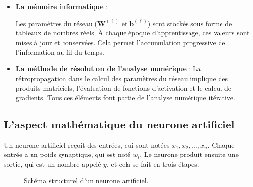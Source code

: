 \begin{itemize}[label=$\bullet$]
	
	\item \textbf{La mémoire informatique} : 
	
	Les paramètres du réseau ($\mathbf{W}^{(\ell)}$ et $\mathbf{b}^{(\ell)}$) sont stockés sous forme de tableaux de nombres réels. À chaque époque d'apprentissage, ces valeurs sont mises à jour et conservées. Cela permet l'accumulation progressive de l'information au fil du temps.
	
	\item \textbf{La méthode de résolution de l'analyse numérique} : La rétropropagation dans le calcul des paramètres du réseau implique des produits matriciels, l'évaluation de fonctions d'activation et le calcul de gradients. Tous ces éléments font partie de l'analyse numérique itérative.
	
\end{itemize}

\subsection{L'aspect mathématique du neurone artificiel}
Un neurone artificiel reçoit des entrées, qui sont notées $x_1, x_2, \ldots, x_n$. Chaque entrée a un poids synaptique, qui est noté $w_i$. Le neurone produit ensuite une sortie, qui est un nombre appelé $y$, et cela se fait en trois étapes.

\begin{figure}[H]
	\centering
	\caption{Schéma structurel d'un neurone artificiel.}
\end{figure}

